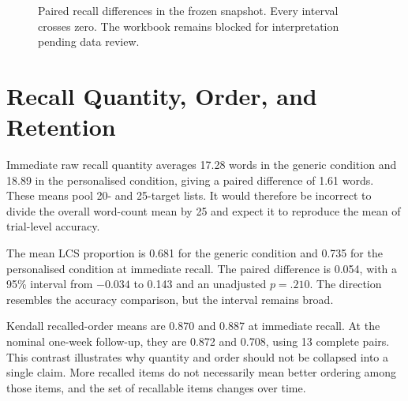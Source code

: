 \begin{figure}[htbp]
\centering
{}
\caption{Paired recall differences in the frozen snapshot. Every interval crosses zero. The workbook remains blocked for interpretation pending data review.}
\label{fig:recallci}
\end{figure}

\section{Recall Quantity, Order, and Retention}
Immediate raw recall quantity averages 17.28 words in the generic condition and 18.89 in the personalised condition, giving a paired difference of 1.61 words. These means pool 20- and 25-target lists. It would therefore be incorrect to divide the overall word-count mean by 25 and expect it to reproduce the mean of trial-level accuracy.

The mean LCS proportion is 0.681 for the generic condition and 0.735 for the personalised condition at immediate recall. The paired difference is 0.054, with a 95\% interval from $-0.034$ to 0.143 and an unadjusted $p=.210$. The direction resembles the accuracy comparison, but the interval remains broad.

Kendall recalled-order means are 0.870 and 0.887 at immediate recall. At the nominal one-week follow-up, they are 0.872 and 0.708, using 13 complete pairs. This contrast illustrates why quantity and order should not be collapsed into a single claim. More recalled items do not necessarily mean better ordering among those items, and the set of recallable items changes over time.

